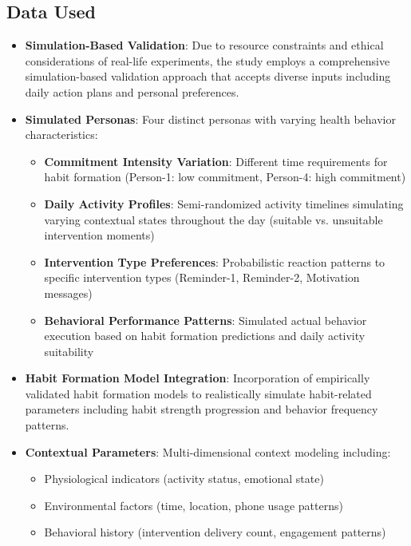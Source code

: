 \subsection*{Data Used}
\begin{itemize}
    \item \textbf{Simulation-Based Validation}: Due to resource constraints and ethical considerations of real-life experiments, the study employs a comprehensive simulation-based validation approach that accepts diverse inputs including daily action plans and personal preferences.
    \item \textbf{Simulated Personas}: Four distinct personas with varying health behavior characteristics:
    \begin{itemize}
        \item \textbf{Commitment Intensity Variation}: Different time requirements for habit formation (Person-1: low commitment, Person-4: high commitment)
        \item \textbf{Daily Activity Profiles}: Semi-randomized activity timelines simulating varying contextual states throughout the day (suitable vs. unsuitable intervention moments)
        \item \textbf{Intervention Type Preferences}: Probabilistic reaction patterns to specific intervention types (Reminder-1, Reminder-2, Motivation messages)
        \item \textbf{Behavioral Performance Patterns}: Simulated actual behavior execution based on habit formation predictions and daily activity suitability
    \end{itemize}
    \item \textbf{Habit Formation Model Integration}: Incorporation of empirically validated habit formation models to realistically simulate habit-related parameters including habit strength progression and behavior frequency patterns.
    \item \textbf{Contextual Parameters}: Multi-dimensional context modeling including:
    \begin{itemize}
        \item Physiological indicators (activity status, emotional state)
        \item Environmental factors (time, location, phone usage patterns)
        \item Behavioral history (intervention delivery count, engagement patterns)
    \end{itemize}
\end{itemize}


